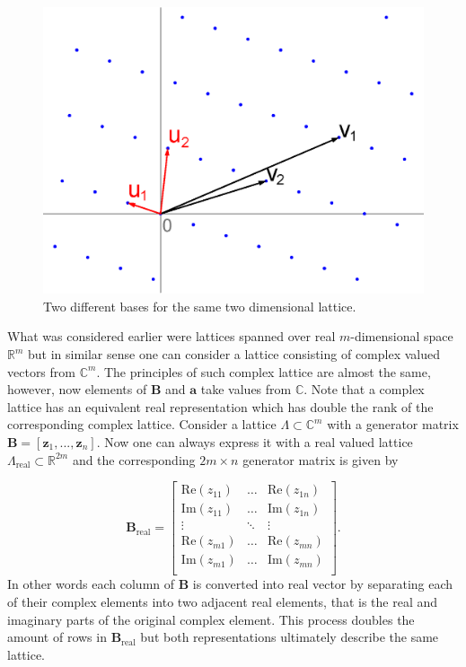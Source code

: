 \documentclass[english,12pt,a4paper,pdftex,sci,utf8]{aaltothesis}
\begin{document}
\begin{figure}[ht]
  \centering
  \includegraphics[width=0.8\linewidth]{Lattice-reduction}
  \caption{Two different bases for the same two dimensional lattice.}
  \label{fig:bases}
\end{figure}

\par What was considered earlier were lattices spanned over real $m$-dimensional space $\mathbb{R}^m$ but in similar sense one can consider a lattice consisting of complex valued vectors from $\mathbb{C}^m$. The principles of such complex lattice are almost the same, however, now elements of $\mathbf{B}$ and $\mathbf{a}$ take values from $\mathbb{C}$. Note that a complex lattice has an equivalent real representation which has double the rank of the corresponding complex lattice. Consider a lattice $\Lambda \subset \mathbb{C}^m$ with a generator matrix $\mathbf{B} = [\mathbf{z}_1, ... , \mathbf{z}_n]$. Now one can always express it with a real valued lattice $\Lambda_{\text{real}} \subset \mathbb{R}^{2m}$ and the corresponding $2m \times n$ generator matrix is given by

\begin{equation}
\mathbf{B}_{\text{real}} =
\begin{bmatrix} 
\text{Re}(z_{11}) & \dots  & \text{Re}(z_{1n}) \\
\text{Im}(z_{11}) & \dots  & \text{Im}(z_{1n}) \\
\vdots            & \ddots & \vdots            \\
\text{Re}(z_{m1}) & \dots  & \text{Re}(z_{mn}) \\
\text{Im}(z_{m1}) & \dots  & \text{Im}(z_{mn}) \\
\end{bmatrix}.
\label{eq:complex}
\end{equation}
In other words each column of $\mathbf{B}$ is converted into real vector by separating each of their complex elements into two adjacent real elements, that is the real and imaginary parts of the original complex element. This process doubles the amount of rows in $\mathbf{B}_{\text{real}}$ but both representations ultimately describe the same lattice. \cite{conway}
\end{document}

